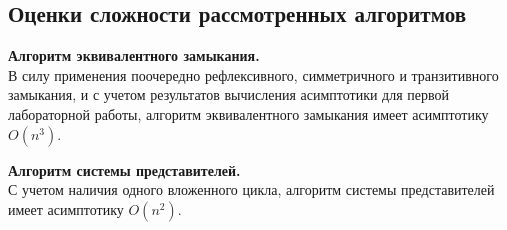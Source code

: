 \documentclass[bachelor, och, labwork]{shiza}
\begin{document}





    \subsection{Оценки сложности рассмотренных алгоритмов}
    
        \textbf{Алгоритм эквивалентного замыкания.}\\
            В силу применения поочередно рефлексивного, симметричного и транзитивного замыкания, и с учетом
            результатов вычисления асимптотики для первой лабораторной работы, алгоритм эквивалентного замыкания имеет асимптотику $O(n^3)$.

        \textbf{Алгоритм системы представителей.}\\
            С учетом наличия одного вложенного цикла, алгоритм системы представителей имеет асимптотику $O(n^2)$.
\end{document}
